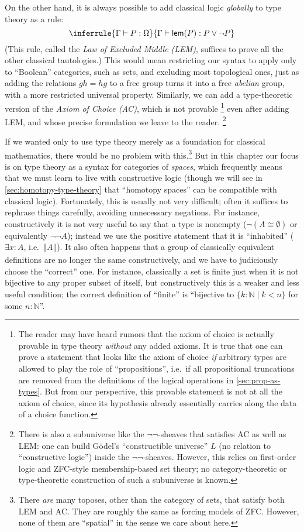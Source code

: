 \documentclass[10pt]{article}
\def\N{\mathbb{N}}
\def\types{\vdash}
\numberwithin{equation}{section}
\newcommand{\trunc}[2]{\mathopen{}\left\Vert #2\right\Vert_{#1}\mathclose{}}
\newcommand{\brck}[1]{\trunc{}{#1}}
\begin{document}
On the other hand, it is always possible to add classical logic \emph{globally} to type theory as a rule:
\[ \inferrule{\Gamma\types P:\Omega}{\Gamma\types \mathsf{lem}(P) : P \vee \neg P} \]
(This rule, called the \emph{Law of Excluded Middle (LEM)}, suffices to prove all the other classical tautologies.)
This would mean restricting our syntax to apply only to ``Boolean'' categories, such as sets, and excluding most topological ones, just as adding the relations $g h = h g$ to a free group turns it into a free \emph{abelian} group, with a more restricted universal property.
Similarly, we can add a type-theoretic version of the \emph{Axiom of Choice (AC)}, which is not provable%
\footnote{The reader may have heard rumors that the axiom of choice is actually provable in type theory \emph{without} any added axioms.
It is true that one can prove a statement that looks like the axiom of choice \emph{if} arbitrary types are allowed to play the role of ``propositions'', i.e.\ if all propositional truncations are removed from the definitions of the logical operations in \cref{sec:prop-as-types}.
But from our perspective, this provable statement is not at all the axiom of choice, since its hypothesis already essentially carries along the data of a choice function.}
even after adding LEM, and whose precise formulation we leave to the reader.%
\footnote{There is also a subuniverse like the $\neg\neg$-sheaves that satisfies AC as well as LEM: one can build G\"odel's ``constructible universe'' $L$ (no relation to ``constructive logic'') inside the $\neg\neg$-sheaves.
  However, this relies on first-order logic and ZFC-style membership-based set theory; no category-theoretic or type-theoretic construction of such a subuniverse is known.}

If we wanted only to use type theory merely as a foundation for classical mathematics, %
there would be no problem with this.\footnote{There \emph{are} many toposes, other than the category of sets, that satisfy both LEM and AC.
  They are roughly the same as forcing models of ZFC.
  However, none of them are ``spatial'' in the sense we care about here.}
But in this chapter our focus is on type theory as a syntax for categories of \emph{spaces}, which frequently means that we must learn to live with constructive logic (though we will see in \cref{sec:homotopy-type-theory} that ``homotopy spaces'' can be compatible with classical logic).
Fortunately, this is usually not very difficult; often it suffices to rephrase things carefully, avoiding unnecessary negations.
For instance, constructively it is not very useful to say that a type is nonempty ($\neg (A \cong \emptyset)$ or equivalently $\neg\neg A$); instead we use the positive statement that it is ``inhabited'' ($\exists x:A$, i.e.\ $\brck{A}$).
It also often happens that a group of classically equivalent definitions are no longer the same constructively, and we have to judiciously choose the ``correct'' one.
For instance, classically a set is finite just when it is not bijective to any proper subset of itself, but constructively  %
this is a weaker and less useful condition; the correct definition of ``finite'' is ``bijective to $\{k:\N \mid k<n \}$ for some $n:\N$''.
\end{document}
